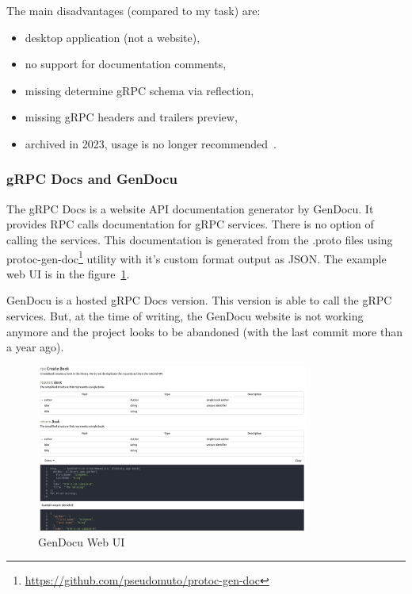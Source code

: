 The main disadvantages (compared to my task) are:
\begin{itemize}
    \item desktop application (not a website),
    \item no support for documentation comments,
    \item missing determine gRPC schema via reflection,
    \item missing gRPC headers and trailers preview,
    \item archived in 2023, usage is no longer recommended~\cite{grpc-bloomrpc}.
\end{itemize}

\subsubsection{gRPC Docs and GenDocu}
The gRPC Docs is a website API documentation generator by GenDocu.
It provides RPC calls documentation for gRPC services.
There is no option of calling the services.
This documentation is generated from the .proto files using protoc-gen-doc\footnote{\url{https://github.com/pseudomuto/protoc-gen-doc}} utility with it's custom format output as JSON\@.
The example web UI is in the figure~\ref{fig:grpc-gendocu}.
\cite{grpc-gendocu}

GenDocu is a hosted gRPC Docs version.
This version is able to call the gRPC services.
But, at the time of writing, the GenDocu website is not working anymore and the project looks to be abandoned (with the last commit more than a year ago).
\cite{grpc-gendocu}

\begin{figure}[hbt!]
    \centering
    \captionsetup{justification=centering}
    \includegraphics[width=0.8\textwidth]{images/grpc/gendocu}
    \caption{GenDocu Web UI~\cite{grpc-gendocu}}
    \label{fig:grpc-gendocu}
\end{figure}

